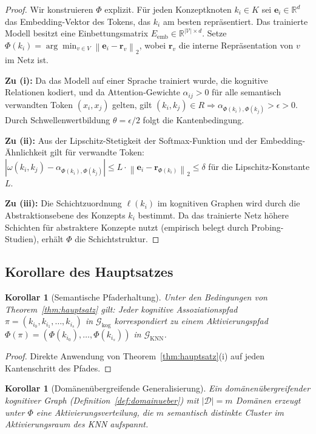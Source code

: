 ﻿\documentclass[12pt,a4paper]{article}
\theoremstyle{plain}
\newtheorem{korollar}[theorem]{Korollar}
\theoremstyle{definition}
\theoremstyle{remark}
\newcommand{\GG}{\mathcal{G}}
\newcommand{\RR}{\mathbb{R}}
\newcommand{\KNN}{\text{KNN}}
\newcommand{\norm}[1]{\left\|#1\right\|}
\begin{document}
\begin{proof}
Wir konstruieren $\Phi$ explizit. Für jeden Konzeptknoten $k_i \in K$ sei $\mathbf{e}_i \in \RR^d$ das Embedding-Vektor des Tokens, das $k_i$ am besten repräsentiert. Das trainierte Modell besitzt eine Einbettungsmatrix $E_{\text{emb}} \in \RR^{|\mathcal{V}| \times d}$. Setze $\Phi(k_i) = \arg\min_{v \in V} \norm{\mathbf{e}_i - \mathbf{r}_v}_2$, wobei $\mathbf{r}_v$ die interne Repräsentation von $v$ im Netz ist.

\textbf{Zu (i):} Da das Modell auf einer Sprache trainiert wurde, die kognitive Relationen kodiert, und da Attention-Gewichte $\alpha_{ij} > 0$ für alle semantisch verwandten Token $(x_i, x_j)$ gelten, gilt $(k_i, k_j) \in R \Rightarrow \alpha_{\Phi(k_i),\Phi(k_j)} > \epsilon > 0$. Durch Schwellenwertbildung $\theta = \epsilon/2$ folgt die Kantenbedingung.

\textbf{Zu (ii):} Aus der Lipschitz-Stetigkeit der Softmax-Funktion und der Embedding-Ähnlichkeit gilt für verwandte Token: $|\omega(k_i,k_j) - \alpha_{\Phi(k_i),\Phi(k_j)}| \leq L \cdot \norm{\mathbf{e}_i - \mathbf{r}_{\Phi(k_i)}}_2 \leq \delta$ für die Lipschitz-Konstante $L$.

\textbf{Zu (iii):} Die Schichtzuordnung $\ell(k_i)$ im kognitiven Graphen wird durch die Abstraktionsebene des Konzepts $k_i$ bestimmt. Da das trainierte Netz höhere Schichten für abstraktere Konzepte nutzt (empirisch belegt durch Probing-Studien), erhält $\Phi$ die Schichtstruktur.
\end{proof}

\subsection{Korollare des Hauptsatzes}

\begin{korollar}[Semantische Pfaderhaltung]
\label{kor:pfad}
Unter den Bedingungen von Theorem~\ref{thm:hauptsatz} gilt: Jeder kognitive Assoziationspfad $\pi = (k_{i_0}, k_{i_1}, \ldots, k_{i_s})$ in $\GG_{\text{kog}}$ korrespondiert zu einem Aktivierungspfad $\Phi(\pi) = (\Phi(k_{i_0}), \ldots, \Phi(k_{i_s}))$ in $\GG_{\KNN}$.
\end{korollar}

\begin{proof}
Direkte Anwendung von Theorem~\ref{thm:hauptsatz}(i) auf jeden Kantenschritt des Pfades.
\end{proof}

\begin{korollar}[Domänenübergreifende Generalisierung]
\label{kor:domaine}
Ein domänenübergreifender kognitiver Graph (Definition~\ref{def:domainueber}) mit $|\mathcal{D}| = m$ Domänen erzeugt unter $\Phi$ eine Aktivierungsverteilung, die $m$ semantisch distinkte Cluster im Aktivierungsraum des KNN aufspannt.
\end{korollar}
\end{document}
